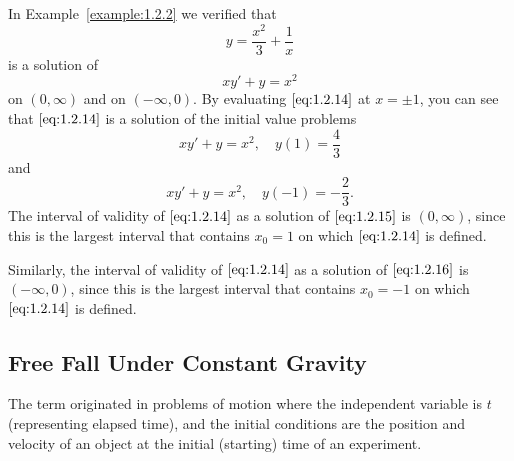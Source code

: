 \documentclass{ximera}
\begin{document}
\begin{example}\label{example:1.2.7}
In Example~\ref{example:1.2.2} we verified that
\begin{equation} \label{eq:1.2.14}
y=\frac{x^2}{3}+\frac{1}{x}
\end{equation}
is a solution of
$$
xy'+y=x^2
$$
on $(0,\infty)$ and on $(-\infty,0)$. By evaluating $\eqref{eq:1.2.14}$ at
$x=\pm 1$, you can see that $\eqref{eq:1.2.14}$ is a solution of the initial
value problems
\begin{equation} \label{eq:1.2.15}
xy'+y=x^2,\quad y(1)=\frac{4}{3}
\end{equation}
and
\begin{equation} \label{eq:1.2.16}
xy'+y=x^2,\quad y(-1)=-\frac{2}{3}.
\end{equation}
The interval of validity of $\eqref{eq:1.2.14}$ as a solution of
$\eqref{eq:1.2.15}$ is $(0,\infty)$, since this is the largest interval
that contains $x_0=1$ on which $\eqref{eq:1.2.14}$ is defined.
 
 
Similarly, the
interval of validity of $\eqref{eq:1.2.14}$ as a solution of $\eqref{eq:1.2.16}$
is $(-\infty,0)$, since this is the largest interval that contains
$x_0=-1$ on which $\eqref{eq:1.2.14}$ is defined.
 
 
\end{example}
 
\subsection*{Free Fall Under Constant Gravity}
 
The term   originated in problems
of motion where the independent variable is $t$
(representing elapsed time), and the initial conditions
are the position and velocity of an object at the initial
(starting) time of an experiment.
 
\end{document}

